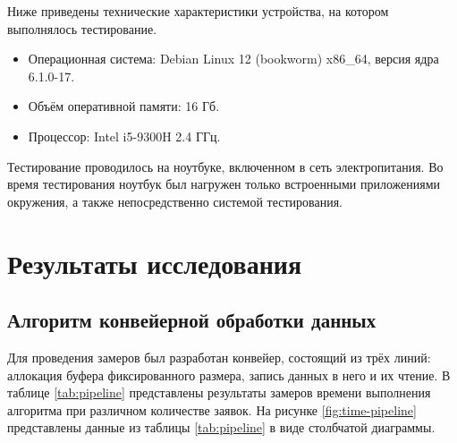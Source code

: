 
Ниже приведены технические характеристики устройства, на котором выполнялось тестирование.

\begin{itemize}[label*=---]
	\item Операционная система: Debian Linux 12 (bookworm) x86\_64, версия ядра 6.1.0-17.
	\item Объём оперативной памяти: 16 Гб.
	\item Процессор: Intel i5-9300H 2.4 ГГц.
\end{itemize}

Тестирование проводилось на ноутбуке, включенном в сеть электропитания. Во время тестирования ноутбук был нагружен только встроенными приложениями окружения, а также непосредственно системой тестирования.



\section{Результаты исследования}

\subsection*{Алгоритм конвейерной обработки данных}

Для проведения замеров был разработан конвейер, состоящий из трёх линий: аллокация буфера фиксированного размера, запись данных в него и их чтение. В таблице \ref{tab:pipeline} представлены результаты замеров времени выполнения алгоритма при различном количестве заявок. На рисунке \ref{fig:time-pipeline} представлены данные из таблицы \ref{tab:pipeline} в виде столбчатой диаграммы.

